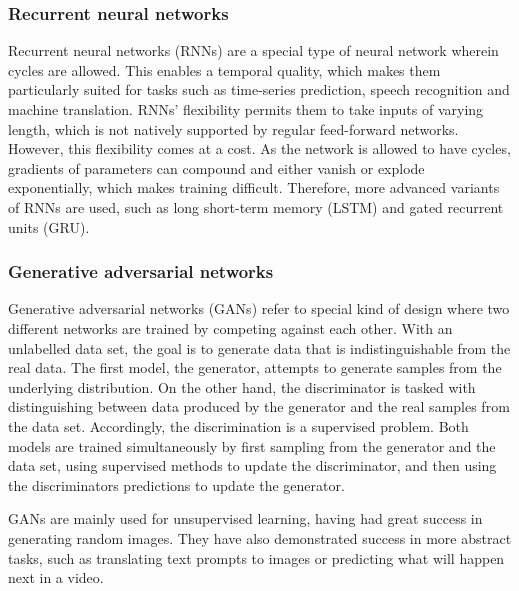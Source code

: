 \subsubsection{Recurrent neural networks}
\label{sec:rnn}
Recurrent neural networks (RNNs) are a special type of neural network wherein cycles are allowed.
This enables a temporal quality, which makes them particularly suited for tasks such as time-series prediction, speech recognition and machine translation.
RNNs' flexibility permits them to take inputs of varying length, which is not natively supported by regular feed-forward networks.
However, this flexibility comes at a cost.
As the network is allowed to have cycles, gradients of parameters can compound and either vanish or explode exponentially, which makes training difficult.
Therefore, more advanced variants of RNNs are used, such as long short-term memory (LSTM) and gated recurrent units (GRU).


\subsubsection{Generative adversarial networks}
Generative adversarial networks (GANs) refer to special kind of design where two different networks are trained by competing against each other.
With an unlabelled data set, the goal is to generate data that is indistinguishable from the real data.
The first model, the generator, attempts to generate samples from the underlying distribution.
On the other hand, the discriminator is tasked with distinguishing between data produced by the generator and the real samples from the data set.
Accordingly, the discrimination is a supervised problem.
Both models are trained simultaneously by first sampling from the generator and the data set, using supervised methods to update the discriminator, and then using the discriminators predictions to update the generator.

GANs are mainly used for unsupervised learning, having had great success in generating random images.
They have also demonstrated success in more abstract tasks, such as translating text prompts to images or predicting what will happen next in a video.